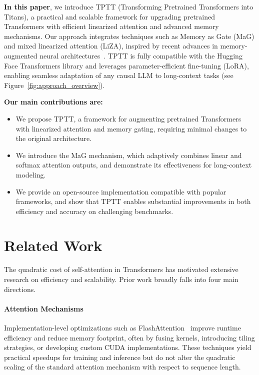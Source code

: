 \documentclass[10pt,a4paper]{article}
\begin{document}
\textbf{In this paper}, we introduce TPTT (Transforming Pretrained Transformers into Titans), a practical and scalable framework for upgrading pretrained Transformers with efficient linearized attention and advanced memory mechanisms. Our approach integrates techniques such as Memory as Gate (MaG) and mixed linearized attention (LiZA), inspired by recent advances in memory-augmented neural architectures~\cite{behrouz2024titans, behrouz2025s}. TPTT is fully compatible with the Hugging Face Transformers library and leverages parameter-efficient fine-tuning (LoRA), enabling seamless adaptation of any causal LLM to long-context tasks (see Figure~\ref{fig:approach_overview}).


\textbf{Our main contributions are:}


\begin{itemize}
    \item We propose TPTT, a framework for augmenting pretrained Transformers with linearized attention and memory gating, requiring minimal changes to the original architecture.
    \item We introduce the MaG mechanism, which adaptively combines linear and softmax attention outputs, and demonstrate its effectiveness for long-context modeling.
    \item We provide an open-source implementation compatible with popular frameworks, and show that TPTT enables substantial improvements in both efficiency and accuracy on challenging benchmarks.
\end{itemize}

\section{Related Work}

The quadratic cost of self-attention in Transformers has motivated extensive research on efficiency and scalability. Prior work broadly falls into four main directions.

\paragraph{Attention Mechanisms}  
Implementation-level optimizations such as FlashAttention~\cite{dao2023flashattention} improve runtime efficiency and reduce memory footprint, often by fusing kernels, introducing tiling strategies, or developing custom CUDA implementations. These techniques yield practical speedups for training and inference but do not alter the quadratic scaling of the standard attention mechanism with respect to sequence length.
\end{document}
